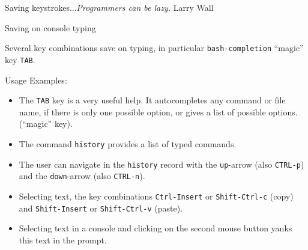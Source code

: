 \begin{frame}{Saving keystrokes...}{\emph{Programmers can be lazy.} Larry Wall}
  \vspace{-0.3cm}
  \begin{block}{Saving on console typing}
    {\footnotesize Several key combinations save on typing, in particular \texttt{bash-completion} ``magic'' key \alert{\texttt{TAB}}.
    
    
    Usage Examples:
  }
  
{  \scriptsize
  \begin{itemize}
\item The \texttt{TAB} key is a very useful help. It autocompletes any command or file name, if there is only one possible option,  or gives a list of possible options. (``magic'' key).\pause
\item The command \texttt{history} provides a list of typed commands.\pause
\item The user can navigate in the \texttt{history} record with the \texttt{up}-arrow (also \texttt{CTRL-p}) and the \texttt{down}-arrow (also \texttt{CTRL-n}).\pause
\item Selecting text, the key combinations \texttt{Ctrl-Insert} or \texttt{Shift-Ctrl-c} (copy) and \texttt{Shift-Insert} or \texttt{Shift-Ctrl-v} (paste).\pause
\item Selecting text in a console and clicking on the second mouse button yanks this text in the prompt.
\end{itemize}

}  
  \end{block}
\end{frame}
